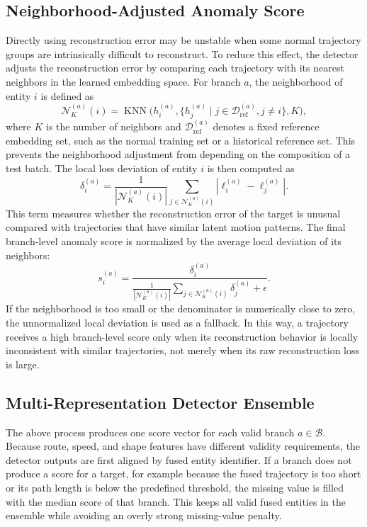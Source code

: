 \subsection{Neighborhood-Adjusted Anomaly Score}
Directly using reconstruction error may be unstable when some normal trajectory groups are intrinsically difficult to reconstruct. To reduce this effect, the detector adjusts the reconstruction error by comparing each trajectory with its nearest neighbors in the learned embedding space. For branch \(a\), the neighborhood of entity \(i\) is defined as
\begin{equation}
  \mathcal{N}_K^{(a)}(i)=
  \operatorname{KNN}
  \big(h_i^{(a)},
  \{h_j^{(a)}\mid j\in\mathcal{D}_{\mathrm{ref}}^{(a)}, j\neq i\},K\big),
\end{equation}
where \(K\) is the number of neighbors and \(\mathcal{D}_{\mathrm{ref}}^{(a)}\) denotes a fixed reference embedding set, such as the normal training set or a historical reference set. This prevents the neighborhood adjustment from depending on the composition of a test batch. The local loss deviation of entity \(i\) is then computed as
\begin{equation}
  \delta_i^{(a)}=
  \frac{1}{|\mathcal{N}_K^{(a)}(i)|}
  \sum_{j\in\mathcal{N}_K^{(a)}(i)}
  \left|\ell_i^{(a)}-\ell_j^{(a)}\right|.
\end{equation}
This term measures whether the reconstruction error of the target is unusual compared with trajectories that have similar latent motion patterns. The final branch-level anomaly score is normalized by the average local deviation of its neighbors:
\begin{equation}
  s_i^{(a)}=
  \frac{\delta_i^{(a)}}
  {
  \frac{1}{|\mathcal{N}_K^{(a)}(i)|}
  \sum_{j\in\mathcal{N}_K^{(a)}(i)}\delta_j^{(a)}+\epsilon
  }.
\end{equation}
If the neighborhood is too small or the denominator is numerically close to zero, the unnormalized local deviation is used as a fallback. In this way, a trajectory receives a high branch-level score only when its reconstruction behavior is locally inconsistent with similar trajectories, not merely when its raw reconstruction loss is large.

\subsection{Multi-Representation Detector Ensemble}
The above process produces one score vector for each valid branch \(a\in\mathcal{B}\). Because route, speed, and shape features have different validity requirements, the detector outputs are first aligned by fused entity identifier. If a branch does not produce a score for a target, for example because the fused trajectory is too short or its path length is below the predefined threshold, the missing value is filled with the median score of that branch. This keeps all valid fused entities in the ensemble while avoiding an overly strong missing-value penalty.

